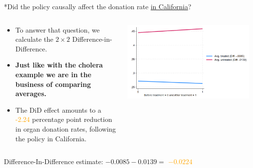 \documentclass[notes,11pt, aspectratio=169]{beamer}
\begin{document}
\begin{frame}{*Did the policy causally affect the donation rate 
\underline{in California}?}
\begin{columns}
\begin{column}{0.5\textwidth}
\begin{itemize}
    \item To answer that question, we calculate the $2\times2$ Difference-in-Difference.
    \item \textbf{Just like with the cholera example we are in the business of comparing averages.}
    \item The DiD effect amounts to a  \textcolor{orange}{-2.24} percentage point reduction in organ donation rates, following the policy in California.
\end{itemize}
\end{column}
\begin{column}{0.5\textwidth}
 \begin{center}
        \includegraphics[width=1\linewidth]{24_DiDLecture/24_DiDLecture_DiD2x2Plot.png}
    \end{center}
\end{column}
\end{columns}
    \flushright
    \vspace{1cm}
    Difference-In-Difference estimate: $-0.0085 - 0.0139 =$   \textcolor{orange}{$ -0.0224$}
\end{frame}
\end{document}
